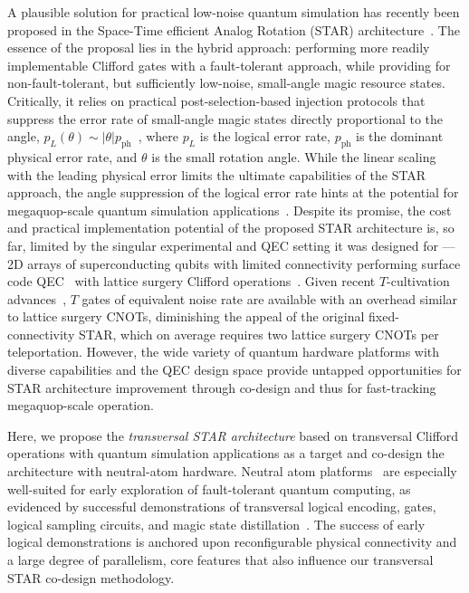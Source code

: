 \documentclass[aps, prx, reprint, superscriptaddress, longbibliography, floatfix]{revtex4-2}
\begin{document}
A plausible solution for practical low-noise quantum simulation has recently been proposed in the Space-Time efficient Analog Rotation (STAR) architecture~\cite{Akahoshi2024, Toshio2024, Akahoshi2024b}. The essence of the proposal lies in the hybrid approach: performing more readily implementable Clifford gates with a fault-tolerant approach, while providing for non-fault-tolerant, but sufficiently low-noise, small-angle magic resource states. Critically, it relies on practical post-selection-based injection protocols that suppress the error rate of small-angle magic states directly proportional to the angle, $p_{L}(\theta) \sim |\theta| p_{\mathrm{ph}}$~\cite{Choi2023,Gavriel2023, Toshio2024, He2025}, where $p_{L}$ is the logical error rate, $p_{\mathrm{ph}}$ is the dominant physical error rate, and $\theta$ is the small rotation angle. While the linear scaling with the leading physical error limits the ultimate capabilities of the STAR approach, the angle suppression of the logical error rate hints at the potential for megaquop-scale quantum simulation applications~\cite{Akahoshi2024b}. Despite its promise, the cost and practical implementation potential of the proposed STAR architecture is, so far, limited by the singular experimental and QEC setting it was designed for --- 2D arrays of superconducting qubits with limited connectivity performing surface code QEC~\cite{Bravyi1998, Fowler2012, Stephens2014} with lattice surgery Clifford operations~\cite{Horsman2012, Litinski2019}. Given recent $T$-cultivation advances~\cite{Gidney2024}, $T$ gates of equivalent noise rate are available with an overhead similar to lattice surgery CNOTs, diminishing the appeal of the original fixed-connectivity STAR, which on average requires two lattice surgery CNOTs per teleportation. However, the wide variety of quantum hardware platforms with diverse capabilities and the QEC design space provide untapped opportunities for STAR architecture improvement through co-design and thus for fast-tracking megaquop-scale operation. 

Here, we propose the \textit{transversal STAR architecture} based on transversal Clifford operations with quantum simulation applications as a target and co-design the architecture with neutral-atom hardware. Neutral atom platforms~\cite{Bernien2017, Ebadi2021, Bluvstein2022, Wurtz2023, Chiu2025} are especially well-suited for early exploration of fault-tolerant quantum computing, as evidenced by successful demonstrations of transversal logical encoding, gates, logical sampling circuits, and magic state distillation~\cite{Bluvstein2024, Rodriguez2024, Bluvstein2025b}. The success of early logical demonstrations is anchored upon reconfigurable physical connectivity and a large degree of parallelism, core features that also influence our transversal STAR co-design methodology.  
\end{document}
